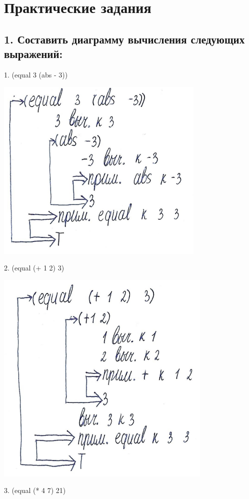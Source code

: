 \documentclass[12pt]{report}
\begin{document}
	
\chapter*{Практические задания}	

\section*{1. Составить диаграмму вычисления следующих выражений:
}

1. (equal 3 (abs - 3))

\includegraphics[scale=1]{img/1.1}

2. (equal (+ 1 2) 3)

\includegraphics[scale=1]{img/1.2}


3. (equal (* 4 7) 21)
\end{document}
